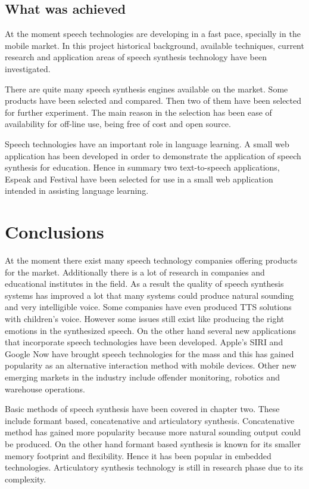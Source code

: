\documentclass[11pt,a4paper,oneside,article]{memoir}
\begin{document}
\section{What was achieved }
At the moment speech technologies are developing in a fast pace, specially in the mobile market. In this project historical background, available techniques, current research and application areas of speech synthesis technology have been investigated.

There are quite many speech synthesis engines available on the market. Some products have been selected and compared. Then  two of them have been selected for further experiment. The main reason in the selection has been ease of availability for off-line use, being free of cost and open source. 

Speech technologies have an important role in language learning. A small web application has been developed in order to demonstrate the application of speech synthesis for education. Hence in summary two text-to-speech applications, Espeak and Festival have been selected for use in a small web application intended in assisting language learning.

\clearpage
\chapter{Conclusions}
At the moment there exist many speech technology companies offering products for the market. Additionally there is a lot of research in companies and educational institutes in the field. As a result the quality of speech synthesis systems has improved a lot that many systems could produce natural sounding and very intelligible voice. Some companies have even produced TTS solutions with children's voice. However some issues still exist like producing the right emotions in the synthesized speech. On the other hand several new applications that incorporate speech technologies have been developed. Apple's SIRI and Google Now have brought speech technologies for the mass and this has gained popularity as an alternative interaction method with mobile devices. Other new emerging markets in the industry include offender monitoring, robotics and warehouse operations.

Basic methods of speech synthesis have been covered in chapter two. These include formant based, concatenative and articulatory synthesis. Concatenative method has gained more popularity because more natural sounding output could be produced. On the other hand formant based synthesis is known for its smaller memory footprint and flexibility. Hence it has been popular in embedded technologies. Articulatory synthesis technology is still in research phase due to its complexity.
\end{document}
